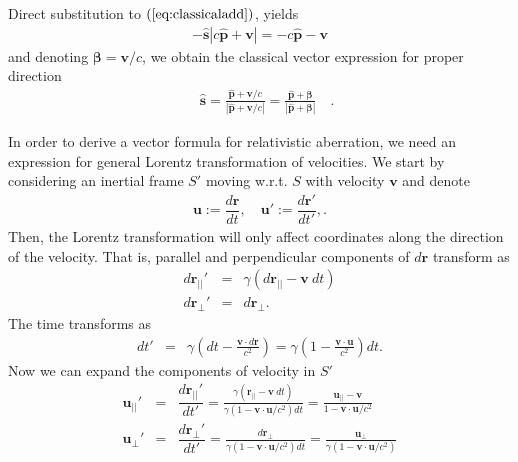 \documentclass [12pt, a4paper] {article}
\newcommand{\vu}[1]
{
	\mathbf{\hat #1}
}
\newcommand{\vc}[1]
{
	\boldsymbol{#1}
}
\newcommand{\diff}[2]
{
	\dfrac{d #1}{d #2}
}
\begin{document}
Direct substitution to $(\ref{eq:classicaladd})$, yields
\begin {eqnarray}
    -\vu s|c\vu p + \vc v|
    =
    -c\vu p - \vc v
\end {eqnarray}
and denoting $\vc\beta = \vc v/c$, we obtain the classical vector expression 
for proper direction
\begin {eqnarray}
    \label{eq:classical_properdir}
    \boxed{
        \quad
        \vu s
        =
        \frac{\vu p + \vc v/c}{|\vu p + \vc v/c|}
        =
        \frac{\vu p + \vc\beta}{|\vu p + \vc\beta|}
        \quad
    }.
\end {eqnarray}

In order to derive a vector formula for relativistic aberration, we need an expression 
for general Lorentz transformation of velocities. We start by considering an inertial 
frame $S'$ moving w.r.t. $S$ with velocity $\vc v$ and denote 
\begin {eqnarray}
    \vc u := \diff{\vc r}{t}, 
    \quad
    \vc u' := \diff{\vc r'}{t'},.
\end {eqnarray}
Then, the Lorentz transformation will only affect coordinates along the direction 
of the velocity. That is, parallel and perpendicular components of $d\vc r$ 
transform as
\begin {eqnarray}
    d\vc r_{||}' &=& \gamma\left(d\vc r_{||} - \vc v\:dt\right)
    \\
    d\vc r_{\perp}' &=& d\vc r_\perp.
\end {eqnarray}
The time transforms as 
\begin {eqnarray}
    dt' &=&
    \gamma\left(
        dt - \frac{\vc v\cdot d\vc r}{c^2}
    \right)
    =
    \gamma\left(
        1 - \frac{\vc v\cdot \vc u}{c^2}
    \right)dt.
\end {eqnarray}
Now we can expand the components of velocity in $S'$
\begin {eqnarray}
    \vc u_{||}'
    &=&
    \diff{\vc r_{||}'}{t'}
    = \frac{\gamma(\vc r_{||} - \vc v\:dt)}{\gamma(1 - \vc v\cdot\vc u/c^2)dt}
    = \frac{\vc u_{||} - \vc v}{1 - \vc v\cdot\vc u/c^2}
    \\
    \vc u_{\perp}'
    &=&
    \diff{\vc r_{\perp}'}{t'}
    =
    \frac{d\vc r_\perp}{\gamma(1 - \vc v\cdot\vc u/c^2)dt}
    =
    \frac{\vc u_\perp}{\gamma(1 - \vc v\cdot\vc u/c^2)}
\end {eqnarray}
\end{document}
